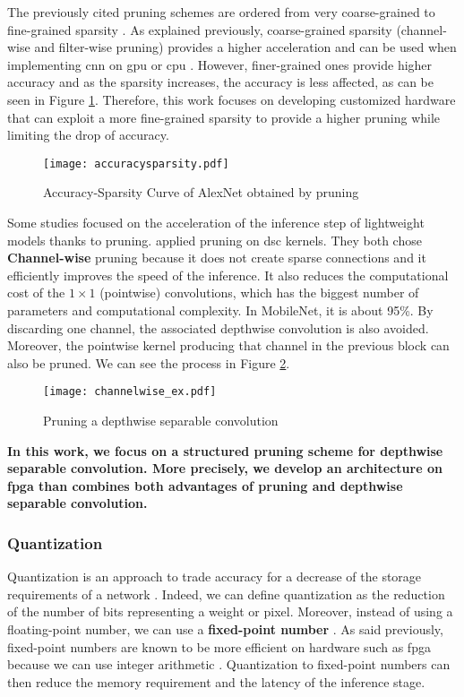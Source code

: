 %
The previously cited pruning schemes are ordered from very coarse-grained to fine-grained sparsity \cite{mao_exploring_2017}. As explained previously, coarse-grained sparsity (channel-wise and filter-wise pruning) provides a higher acceleration and can be used when implementing \acrshort{cnn} on \acrshort{gpu} or \acrshort{cpu} \cite{cheng_recent_2018, mao_exploring_2017}. However, finer-grained ones provide higher accuracy and as the sparsity increases, the accuracy is less affected, as can be seen in Figure \ref{fig:pruning-accuracy}. Therefore, this work focuses on developing customized hardware that can exploit a more fine-grained sparsity \cite{mao_exploring_2017} to provide a higher pruning while limiting the drop of accuracy.
%
\begin{figure}[H]
    \centering
    \texttt{[image: accuracysparsity.pdf]}
    \caption{Accuracy-Sparsity Curve of AlexNet obtained by pruning \cite{mao_exploring_2017}}
    \label{fig:pruning-accuracy}
\end{figure}
%
Some studies focused on the acceleration of the inference step of lightweight models thanks to pruning. \textcite{zhang_channel_2019, tu_pruning_2019} applied pruning on \acrshort{dsc} kernels. They both chose \textbf{Channel-wise} pruning because it does not create sparse connections and it efficiently improves the speed of the inference. It also reduces the computational cost of the $1 \times 1$ (pointwise) convolutions, which has the biggest number of parameters and computational complexity. In MobileNet, it is about 95\%. By discarding one channel, the associated depthwise convolution is also avoided.
Moreover, the pointwise kernel producing that channel in the previous block can also be pruned. We can see the process in Figure \ref{fig:pruning_dsc}.
%
\begin{figure}[H]
    \centering
    \texttt{[image: channelwise\_ex.pdf]}
    \caption{Pruning a depthwise separable convolution \cite{tu_pruning_2019}}
    \label{fig:pruning_dsc}
\end{figure}

\textbf{In this work, we focus on a structured pruning scheme for depthwise separable convolution. More precisely, we develop an architecture on \acrshort{fpga} than combines both advantages of pruning and depthwise separable convolution.}
%
\subsubsection{Quantization} \label{subs:quantization}
%
%
Quantization is an approach to trade accuracy for a decrease of the storage requirements of a network \cite{han_deep_2016}. Indeed, we can define quantization as the reduction of the number of bits representing a weight or pixel. Moreover, instead of using a floating-point number, we can use a \textbf{fixed-point number} \cite{cheng_recent_2018}. As said previously, fixed-point numbers are known to be more efficient on hardware such as \acrshort{fpga} because we can use integer arithmetic \cite{david_hardware_2007}. Quantization to fixed-point numbers can then reduce the memory requirement and the latency of the inference stage.

